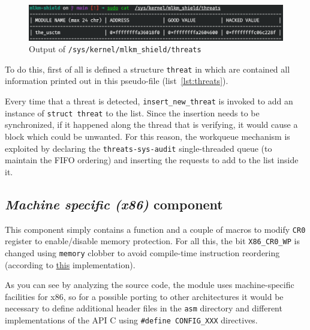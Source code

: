 \documentclass{article}
\begin{document}
	\begin{figure}[!htbp]
		\centering
		\includegraphics[scale=0.4]{threats}
		\caption{Output of \texttt{/sys/kernel/mlkm\_shield/threats}}
		\label{fig:threats}
	\end{figure}

	To do this, first of all is defined a structure \texttt{threat} in which are contained all information printed out
	in this pseudo-file (list~\ref{lst:threats}).

	Every time that a threat is detected, \texttt{insert\_new\_threat} is invoked to add an instance of \texttt{struct
	threat} to the list. Since the insertion needs to be synchronized, if it happened along the thread that is
	verifying, it would cause a block which could be unwanted. For this reason, the workqueue mechanism is exploited by
	declaring the \texttt{threats-sys-audit} single-threaded queue (to maintain the FIFO ordering) and inserting the
	requests to add to the list inside it.

	\subsection{\emph{Machine specific (x86)} component}\label{sec:x86}
	This component simply contains a function and a couple of macros to modify \texttt{CR0} register to enable/disable
	memory protection. For all this, the bit \texttt{X86\_CR0\_WP} is changed using \texttt{memory} clobber to avoid
	compile-time instruction reordering (according to
	\href{https://elixir.bootlin.com/linux/v5.17.3/source/arch/x86/include/asm/special_insns.h#L54}{this}
	implementation).

	As you can see by analyzing the source code, the module uses machine-specific facilities for x86, so for a possible
	porting to other architectures it would be necessary to define additional header files in the \texttt{asm}
	directory and different implementations of the API C using \texttt{\#define CONFIG\_XXX} directives.
\end{document}
